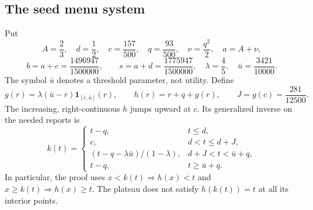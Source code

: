 \subsection{The seed menu system}\label{sec:refined-mechanism}
Put
\[
 A=\frac23,\quad d=\frac12,\quad c=\frac{157}{500},\quad
 q=\frac{93}{500},\quad \nu=\frac{q^2}{2},\quad a=A+\nu,
\]
\[
 b=a+c=\frac{1496947}{1500000},\qquad
 s=a+d=\frac{1775947}{1500000},\quad
 \lambda=\frac45,\quad \bar u=\frac{3421}{10000}.
\]
The symbol $\bar u$ denotes a threshold parameter, not utility. Define
\begin{equation}\label{eq:refined-threshold}
 g(r)=\lambda(\bar u-r)\mathbf1_{[c,\bar u]}(r),\qquad
 h(r)=r+q+g(r),\qquad J=g(c)=\frac{281}{12500}.
\end{equation}
The increasing, right-continuous $h$ jumps upward at $c$. Its generalized
inverse on the needed reports is
\[
 k(t)=\begin{cases}
 t-q,&t\le d,\\
 c,&d<t\le d+J,\\
 (t-q-\lambda\bar u)/(1-\lambda),&d+J<t<\bar u+q,\\
 t-q,&t\ge\bar u+q.
 \end{cases}
\]
In particular, the proof uses $x<k(t)\Rightarrow h(x)<t$ and
$x\ge k(t)\Rightarrow h(x)\ge t$. The plateau does not satisfy
$h(k(t))=t$ at all its interior points.

